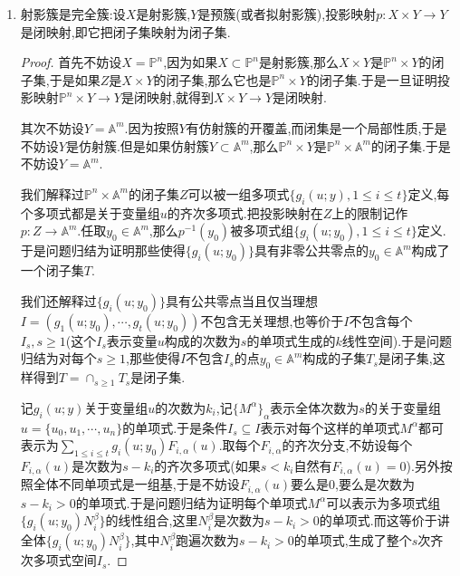 \begin{enumerate}
\begin{enumerate}
\begin{proof}
			假设这个仿射簇存在至少两个点,那么至少存在一个坐标函数不是常值的,但是上一条解释了不可约完全簇的正则函数只有常值函数,这就说明仿射簇如果是完全簇必然只能是单点集.
		\end{proof}
	\end{enumerate}
    \item 射影簇是完全簇:设$X$是射影簇,$Y$是预簇(或者拟射影簇),投影映射$p:X\times Y\to Y$是闭映射,即它把闭子集映射为闭子集.
    \begin{proof}
    	
    	首先不妨设$X=\mathbb{P}^n$,因为如果$X\subset\mathbb{P}^n$是射影簇,那么$X\times Y$是$\mathbb{P}^n\times Y$的闭子集,于是如果$Z$是$X\times Y$的闭子集,那么它也是$\mathbb{P}^n\times Y$的闭子集.于是一旦证明投影映射$\mathbb{P}^n\times Y\to Y$是闭映射,就得到$X\times Y\to Y$是闭映射.
    	
    	\qquad
    	
    	其次不妨设$Y=\mathbb{A}^m$.因为按照$Y$有仿射簇的开覆盖,而闭集是一个局部性质,于是不妨设$Y$是仿射簇.但是如果仿射簇$Y\subset\mathbb{A}^m$,那么$\mathbb{P}^n\times Y$是$\mathbb{P}^n\times\mathbb{A}^m$的闭子集.于是不妨设$Y=\mathbb{A}^m$.
    	
    	\qquad
    	
    	我们解释过$\mathbb{P}^n\times\mathbb{A}^m$的闭子集$Z$可以被一组多项式$\{g_i(u;y),1\le i\le t\}$定义,每个多项式都是关于变量组$u$的齐次多项式.把投影映射在$Z$上的限制记作$p:Z\to\mathbb{A}^m$.任取$y_0\in\mathbb{A}^m$,那么$p^{-1}(y_0)$被多项式组$\{g_i(u;y_0),1\le i\le t\}$定义.于是问题归结为证明那些使得$\{g_i(u;y_0)\}$具有非零公共零点的$y_0\in\mathbb{A}^m$构成了一个闭子集$T$.
    	
    	\qquad
    	
    	我们还解释过$\{g_i(u;y_0)\}$具有公共零点当且仅当理想$I=\left(g_1(u;y_0),\cdots,g_t(u;y_0)\right)$不包含无关理想,也等价于$I$不包含每个$I_s,s\ge1$(这个$I_s$表示变量$u$构成的次数为$s$的单项式生成的$k$线性空间).于是问题归结为对每个$s\ge1$,那些使得$I$不包含$I_s$的点$y_0\in\mathbb{A}^m$构成的子集$T_s$是闭子集,这样得到$T=\cap_{s\ge1}T_s$是闭子集.
    	
    	\qquad
    	
    	记$g_i(u;y)$关于变量组$u$的次数为$k_i$,记$\{M^{\alpha}\}_{\alpha}$表示全体次数为$s$的关于变量组$u=\{u_0,u_1,\cdots,u_n\}$的单项式.于是条件$I_s\subseteq I$表示对每个这样的单项式$M^{\alpha}$都可表示为$\sum_{1\le i\le t}g_i(u;y_0)F_{i,\alpha}(u)$.取每个$F_{i,\alpha}$的齐次分支,不妨设每个$F_{i,\alpha}(u)$是次数为$s-k_i$的齐次多项式(如果$s<k_i$自然有$F_{i,\alpha}(u)=0$).另外按照全体不同单项式是一组基,于是不妨设$F_{i,\alpha}(u)$要么是0,要么是次数为$s-k_i>0$的单项式.于是问题归结为证明每个单项式$M^{\alpha}$可以表示为多项式组$\{g_i(u;y_0)N_i^{\beta}\}$的线性组合,这里$N_i^{\beta}$是次数为$s-k_i>0$的单项式.而这等价于讲全体$\{g_i(u;y_0)N_i^{\beta}\}$,其中$N_i^{\beta}$跑遍次数为$s-k_i>0$的单项式,生成了整个$s$次齐次多项式空间$I_s$.
    	

\end{proof}
\end{enumerate}
